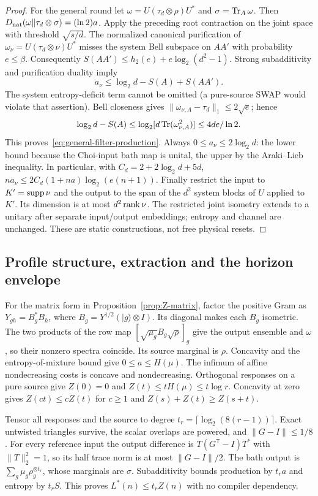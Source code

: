 \begin{proof}
For the general round let $\omega=U(\tau_d\otimes\rho)U^*$ and
$\sigma=\operatorname{Tr}_A\omega$. Then
$D_{\rm nat}(\omega\Vert\tau_d\otimes\sigma)=(\ln2)a$.
Apply the preceding root contraction on the joint space with threshold
$\sqrt{s/d}$. The normalized canonical purification of
$\omega_\nu=U(\tau_d\otimes\nu)U^*$ misses the system Bell subspace
on $AA'$ with probability $e\leq\beta$. Consequently
$S(AA')\leq h_2(e)+e\log_2(d^2-1)$.
Strong subadditivity and purification duality imply
\[
 a_\nu\leq\log_2d-S(A)+S(AA').
\]
The system entropy-deficit term cannot be omitted (a pure-source SWAP
would violate that assertion). Bell closeness gives
$\|\omega_{\nu,A}-\tau_d\|_1\leq2\sqrt e$; hence
\[
 \log_2d-S(A)\leq\log_2[d\operatorname{Tr}(\omega_{\nu,A}^2)]
 \leq4de/\ln2.
\]
This proves~\eqref{eq:general-filter-production}. Always
$0\leq a_\nu\leq2\log_2d$: the lower bound because the Choi-input bath map is unital, the upper by the Araki--Lieb inequality.
In particular, with $C_d=2+2\log_2d+5d$,
$na_\nu\leq2C_d(1+na)\log_2(e(n+1))$.
Finally restrict the input to $K'=\operatorname{supp}\nu$ and the output to the span
of the $d^2$ system blocks of $U$ applied to $K'$. Its dimension is
at most $d^2\operatorname{rank}\nu$. The restricted joint isometry extends to a
unitary after separate input/output embeddings; entropy and channel
are unchanged. These are static constructions, not free physical resets.
\end{proof}

\subsection{Profile structure, extraction and the horizon envelope}
For the matrix form in Proposition~\ref{prop:Z-matrix}, factor the
positive Gram as $Y_{gh}=B_g^*B_h$, where
$B_g=Y^{1/2}(|g\rangle\otimes I)$. Its diagonal makes each $B_g$
isometric. The two products of the row map
$[\sqrt{\mu_g}B_g\sqrt\rho]_g$ give the output ensemble and $\omega$,
so their nonzero spectra coincide. Its source marginal is $\rho$.
Concavity and the entropy-of-mixture bound give $0\leq a\leq H(\mu)$.
The infimum of affine nondecreasing costs is concave and nondecreasing.
Orthogonal responses on a pure source give $Z(0)=0$ and
$Z(t)\leq tH(\mu)\leq t\log r$. Concavity at zero gives
$Z(ct)\leq cZ(t)$ for $c\geq1$ and
$Z(s)+Z(t)\geq Z(s+t)$.

Tensor all responses and the source to degree
$t_r=\lceil\log_2(8(r-1))\rceil$. Exact untwisted triangles survive,
the scalar overlaps are powered, and $\|G-I\|\leq1/8$.
For every reference input the output difference is
$T(G^{\mathsf T}-I)T^*$ with $\|T\|_2^2=1$, so its half trace norm
is at most $\|G-I\|/2$. The bath output is
$\sum_g\mu_g\rho_g^{\otimes t_r}$, whose marginals are $\sigma$.
Subadditivity bounds production by $t_ra$ and entropy by $t_rS$.
This proves $L^*(n)\leq t_rZ(n)$ with no compiler dependency.

